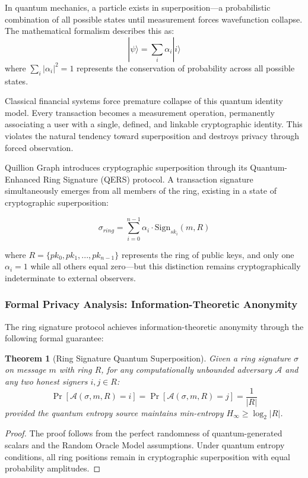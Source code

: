 \documentclass[12pt,a4paper]{article}
\newtheorem{theorem}{Theorem}[section]
\begin{document}
In quantum mechanics, a particle exists in superposition—a probabilistic combination of all possible states until measurement forces wavefunction collapse. The mathematical formalism describes this as:
$$|\psi\rangle = \sum_{i} \alpha_i |i\rangle$$
where $\sum_{i} |\alpha_i|^2 = 1$ represents the conservation of probability across all possible states.

Classical financial systems force premature collapse of this quantum identity model. Every transaction becomes a measurement operation, permanently associating a user with a single, defined, and linkable cryptographic identity. This violates the natural tendency toward superposition and destroys privacy through forced observation.

Quillion Graph introduces cryptographic superposition through its Quantum-Enhanced Ring Signature (QERS) protocol. A transaction signature simultaneously emerges from all members of the ring, existing in a state of cryptographic superposition:

$$\sigma_{ring} = \sum_{i=0}^{n-1} \alpha_i \cdot \text{Sign}_{sk_i}(m, R)$$

where $R = \{pk_0, pk_1, ..., pk_{n-1}\}$ represents the ring of public keys, and only one $\alpha_i = 1$ while all others equal zero—but this distinction remains cryptographically indeterminate to external observers.

\subsubsection{Formal Privacy Analysis: Information-Theoretic Anonymity}

The ring signature protocol achieves information-theoretic anonymity through the following formal guarantee:

\begin{theorem}[Ring Signature Quantum Superposition]
Given a ring signature $\sigma$ on message $m$ with ring $R$, for any computationally unbounded adversary $\mathcal{A}$ and any two honest signers $i, j \in R$:
$$\Pr[\mathcal{A}(\sigma, m, R) = i] = \Pr[\mathcal{A}(\sigma, m, R) = j] = \frac{1}{|R|}$$
provided the quantum entropy source maintains min-entropy $H_\infty \geq \log_2|R|$.
\end{theorem}

\begin{proof}
The proof follows from the perfect randomness of quantum-generated scalars and the Random Oracle Model assumptions. Under quantum entropy conditions, all ring positions remain in cryptographic superposition with equal probability amplitudes.
\end{proof}
\end{document}
